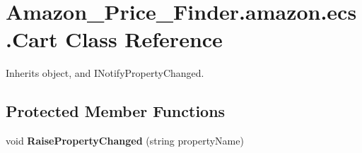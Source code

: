 \hypertarget{class_amazon___price___finder_1_1amazon_1_1ecs_1_1_cart}{\section{Amazon\-\_\-\-Price\-\_\-\-Finder.\-amazon.\-ecs.\-Cart Class Reference}
\label{class_amazon___price___finder_1_1amazon_1_1ecs_1_1_cart}
}


 




Inherits object, and I\-Notify\-Property\-Changed.

\subsection*{Protected Member Functions}
\begin{DoxyCompactItemize}
\item 
\hypertarget{class_amazon___price___finder_1_1amazon_1_1ecs_1_1_cart_ab65f21056b76c90c4e81bcc97f074bfb}{void {\bfseries Raise\-Property\-Changed} (string property\-Name)}\label{class_amazon___price___finder_1_1amazon_1_1ecs_1_1_cart_ab65f21056b76c90c4e81bcc97f074bfb}

\end{DoxyCompactItemize}
